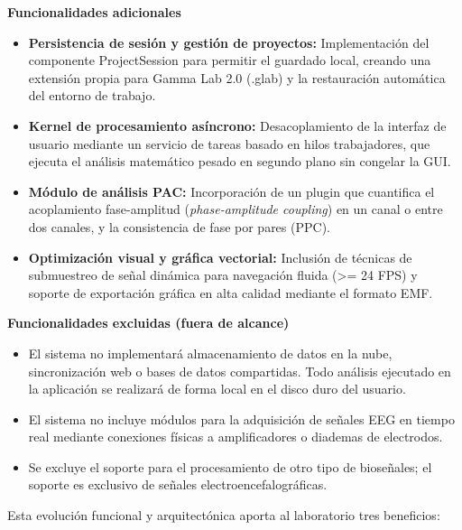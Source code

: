 \documentclass[12pt, letterpaper]{article}
\begin{document}
\textbf{Funcionalidades adicionales}
\begin{itemize}

\item \textbf{Persistencia de sesión y gestión de proyectos:} Implementación del componente ProjectSession para permitir el guardado local, creando una extensión propia para Gamma Lab 2.0 (.glab) y la restauración automática del entorno de trabajo.

\item \textbf{Kernel de procesamiento asíncrono:} Desacoplamiento de la interfaz de usuario mediante un servicio de tareas basado en hilos trabajadores, que ejecuta el análisis matemático pesado en segundo plano sin congelar la GUI.

\item \textbf{Módulo de análisis PAC:} Incorporación de un plugin que cuantifica el acoplamiento fase-amplitud (\textit{phase-amplitude coupling}) en un canal o entre dos canales, y la consistencia de fase por pares (PPC).

\item \textbf{Optimización visual y gráfica vectorial:} Inclusión de técnicas de submuestreo de señal dinámica para navegación fluida (>= 24 FPS) y soporte de exportación gráfica en alta calidad mediante el formato EMF.

\end{itemize}

\textbf{Funcionalidades excluidas (fuera de alcance)}
\begin{itemize}

\item El sistema no implementará almacenamiento de datos en la nube, sincronización web o bases de datos compartidas. Todo análisis ejecutado en la aplicación se realizará de forma local en el disco duro del usuario.

\item El sistema no incluye módulos para la adquisición de señales EEG en tiempo real mediante conexiones físicas a amplificadores o diademas de electrodos.

\item Se excluye el soporte para el procesamiento de otro tipo de bioseñales; el soporte es exclusivo de señales electroencefalográficas.

\end{itemize}

Esta evolución funcional y arquitectónica aporta al laboratorio tres beneficios:
\end{document}
